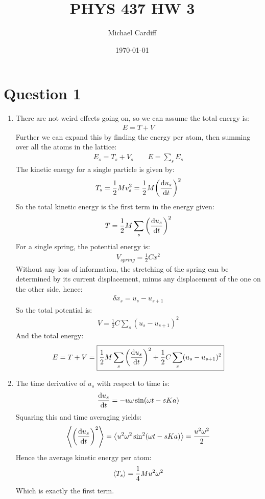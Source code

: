 \documentclass[12pt]{article}
\title{\vspace{-3em}PHYS 437 HW 3}
\author{Michael Cardiff}
\date{\today}
\begin{document}
\maketitle
\section*{Question 1}
\begin{enumerate}[label=\alph*)]
\item There are not weird effects going on, so we can assume the total energy is:
  \begin{align*}
    E=T+V
  \end{align*}
  Further we can expand this by finding the energy per atom, then summing over all the atoms in the lattice:
  \begin{align*}
    E_s=T_s+V_s\qquad E=\sum_s E_s
  \end{align*}
  The kinetic energy for a single particle is given by:
  \begin{align*}
    T_s=\frac{1}{2}Mv_s^2=\frac{1}{2}M\qty(\dv{u_s}{t})^2
  \end{align*}
  So the total kinetic energy is the first term in the energy given:
  \begin{align*}
    T=\frac{1}{2}M\sum_s\qty(\dv{u_s}{t})^2
  \end{align*}
  For a single spring, the potential energy is:
  \begin{align*}
    V_{spring}=\frac{1}{2}Cx^2
  \end{align*}
  Without any loss of information, the stretching of the spring can be determined by its current displacement, minus any displacement of the one on the other side, hence:
  \begin{align*}
    \delta{x}_s=u_s-u_{s+1}
  \end{align*}
  So the total potential is:
  \begin{align*}
    V=\frac{1}{2}C\sum_s(u_s-u_{s+1})^2
  \end{align*}
  And the total energy:
  \begin{align*}
    E=T+V=\boxed{\frac{1}{2}M\sum_s\qty(\dv{u_s}{t})^2+
    \frac{1}{2}C\sum_s(u_s-u_{s+1})^2}
  \end{align*}
\item The time derivative of $u_s$ with respect to time is:
  \begin{align*}
    \dv{u_s}{t}=-u\omega\sin(\omega t - sKa)
  \end{align*}
  Squaring this and time averaging yields:
  \begin{align*}
    \ev{\qty(\dv{u_s}{t})^2}=\ev{u^2\omega^2\sin^2(\omega t- sKa)}
    =\frac{u^2\omega^2}{2}
  \end{align*}
  Hence the average kinetic energy per atom:
  \begin{align*}
    \ev{T_s}=\frac{1}{4}Mu^2\omega^2
  \end{align*}
  Which is exactly the first term.


\end{enumerate}
\end{document}
